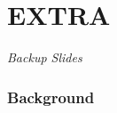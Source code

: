 \documentclass[handout,10pt]{beamer}
\begin{document}
%









\appendix
\part{EXTRA}
\begin{frame}
	\begin{center}
	\Huge\emph{Backup Slides}
	\end{center}
\end{frame}
\addtocounter{framenumber}{-1}


\section{Background}
\end{document}
